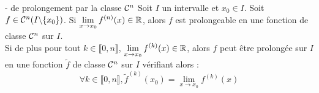 

    \begin{theoreme}{18.42}{- de prolongement par la classe $\mathcal{C}^n$}
        Soit $I$ un intervalle et $x_0 \in I$. Soit $f\in\mathcal{C}^n(I \backslash \{x_0\})$. Si $\displaystyle \lim_{x \to x_0} f^{(n)}(x) \in \mathbb{R}$, alors $f$ est prolongeable en une fonction de classe $\mathcal{C}^n$ sur $I$.\\
        Si de plus pour tout $k \in \llbracket 0,n \rrbracket$, $\displaystyle \lim_{x \to x_0} f^{(k)}(x) \in \mathbb{R}$, alors $f$ peut être prolongée sur $I$ en une fonction $\tilde{f}$ de classe $\mathcal{C}^n$ sur $I$ vérifiant alors :$$\forall k \in \llbracket 0,n\rrbracket, \tilde{f}^{(k)}(x_0) = \lim_{x \to x_0} f^{(k)}(x)$$ 
    \end{theoreme}
